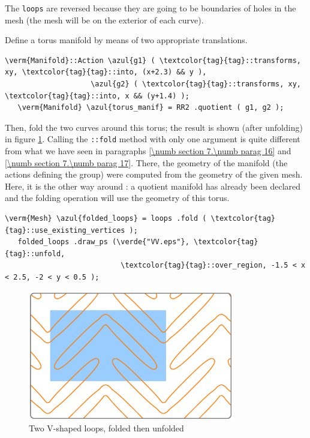 The {\small\tt loops} are reversed because they are going to be boundaries of holes
in the mesh (the mesh will be on the exterior of each curve).

Define a torus manifold by means of two appropriate translations.

\begin{Verbatim}[commandchars=\\\{\},formatcom=\small\tt,frame=single,
   rulecolor=\color{coment},baselinestretch=0.94,framesep=2mm         ]
   \verm{Manifold}::Action \azul{g1} ( \textcolor{tag}{tag}::transforms, xy, \textcolor{tag}{tag}::into, (x+2.3) && y ),
                    \azul{g2} ( \textcolor{tag}{tag}::transforms, xy, \textcolor{tag}{tag}::into, x && (y+1.4) );
   \verm{Manifold} \azul{torus_manif} = RR2 .quotient ( g1, g2 );
\end{Verbatim}

\vskip -2mm
Then, fold the two curves around this torus; the result is shown (after unfolding) in figure
\ref{\numb section 7.\numb fig 15}.
Calling the {\small\tt{}::fold} method with only one argument is quite different
from what we have seen in paragraphs \ref{\numb section 7.\numb parag 16} and
\ref{\numb section 7.\numb parag 17}.
There, the geometry of the manifold (the actions defining the group) were computed from
the geometry of the given mesh.
Here, it is the other way around : a quotient manifold has already been declared and
the folding operation will use the geometry of this torus.

\begin{Verbatim}[commandchars=\\\{\},formatcom=\small\tt,frame=single,
   rulecolor=\color{coment},baselinestretch=0.94,framesep=2mm         ]
   \verm{Mesh} \azul{folded_loops} = loops .fold ( \textcolor{tag}{tag}::use_existing_vertices );
   folded_loops .draw_ps (\verde{"VV.eps"}, \textcolor{tag}{tag}::unfold,
                           \textcolor{tag}{tag}::over_region, -1.5 < x < 2.5, -2 < y < 0.5 );
\end{Verbatim}

\begin{figure}[ht] \centering
  \includegraphics[width=90mm]{boomerang-2.eps}
  \caption{Two V-shaped loops, folded then unfolded}
  \label{\numb section 7.\numb fig 15}
\end{figure}

